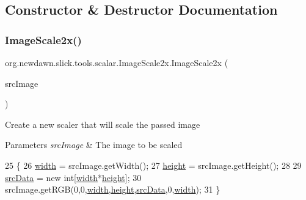 \subsection{Constructor \& Destructor Documentation}
\mbox{\label{classorg_1_1newdawn_1_1slick_1_1tools_1_1scalar_1_1_image_scale2x_a12bf7e058086627fa263f724a63bd7d1}} 
\subsubsection{\texorpdfstring{Image\+Scale2x()}{ImageScale2x()}}
{\footnotesize\ttfamily org.\+newdawn.\+slick.\+tools.\+scalar.\+Image\+Scale2x.\+Image\+Scale2x (\begin{DoxyParamCaption}\item[{Buffered\+Image}]{src\+Image }\end{DoxyParamCaption})\hspace{0.3cm}{\ttfamily [inline]}}

Create a new scaler that will scale the passed image


\begin{DoxyParams}{Parameters}
{\em src\+Image} & The image to be scaled \\
\hline
\end{DoxyParams}

\begin{DoxyCode}
25     \{
26         \mbox{\hyperlink{classorg_1_1newdawn_1_1slick_1_1tools_1_1scalar_1_1_image_scale2x_a026c0d00d9a8c601693fabe4771fdb1a}{width}} = srcImage.getWidth();
27         \mbox{\hyperlink{classorg_1_1newdawn_1_1slick_1_1tools_1_1scalar_1_1_image_scale2x_a06d02dc2cf0a017990d03ce89441b553}{height}} = srcImage.getHeight();
28         
29         \mbox{\hyperlink{classorg_1_1newdawn_1_1slick_1_1tools_1_1scalar_1_1_image_scale2x_a46fef900f8554bbdd22de7e816ebaef3}{srcData}} = \textcolor{keyword}{new} \textcolor{keywordtype}{int}[\mbox{\hyperlink{classorg_1_1newdawn_1_1slick_1_1tools_1_1scalar_1_1_image_scale2x_a026c0d00d9a8c601693fabe4771fdb1a}{width}}*\mbox{\hyperlink{classorg_1_1newdawn_1_1slick_1_1tools_1_1scalar_1_1_image_scale2x_a06d02dc2cf0a017990d03ce89441b553}{height}}];
30         srcImage.getRGB(0,0,\mbox{\hyperlink{classorg_1_1newdawn_1_1slick_1_1tools_1_1scalar_1_1_image_scale2x_a026c0d00d9a8c601693fabe4771fdb1a}{width}},\mbox{\hyperlink{classorg_1_1newdawn_1_1slick_1_1tools_1_1scalar_1_1_image_scale2x_a06d02dc2cf0a017990d03ce89441b553}{height}},\mbox{\hyperlink{classorg_1_1newdawn_1_1slick_1_1tools_1_1scalar_1_1_image_scale2x_a46fef900f8554bbdd22de7e816ebaef3}{srcData}},0,\mbox{\hyperlink{classorg_1_1newdawn_1_1slick_1_1tools_1_1scalar_1_1_image_scale2x_a026c0d00d9a8c601693fabe4771fdb1a}{width}});              
31     \}
\end{DoxyCode}


